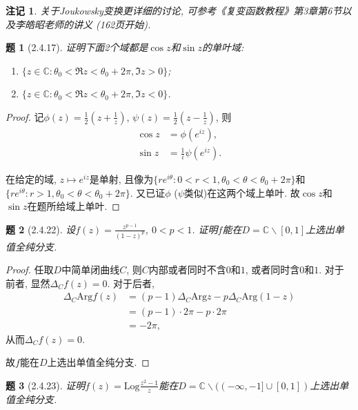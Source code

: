 \documentclass{article}[a4paper, 12pt]
\newtheorem{problem}{题}
\newtheorem*{remark}{注记}
\begin{document}
\begin{remark}
  关于Joukowsky变换更详细的讨论, 可参考《复变函数教程》第3章第6节以及李皓昭老师的讲义 (162页开始).
\end{remark}

\begin{problem}[2.4.17]
  证明下面2个域都是\(\cos z\)和\(\sin z\)的单叶域:
  \begin{enumerate}
    \item \(\{z\in\mathbb C:\theta_0<\Re z<\theta_0+2\pi, \Im z>0\}\);
    \item \(\{z\in\mathbb C:\theta_0<\Re z<\theta_0+2\pi, \Im z<0\}\).
  \end{enumerate}
\end{problem}

\begin{proof}
  记\(\phi(z)=\frac12(z+\frac1z)\), \(\psi(z)=\frac12(z-\frac1z)\), 则\begin{align*}
    \cos z&=\phi(e^{iz}),\\
    \sin z&=\frac1i\psi(e^{iz}).
  \end{align*}

  在给定的域, \(z\mapsto e^{iz}\)是单射, 且像为\(\{re^{i\theta}:0<r<1,\theta_0<\theta<\theta_0+2\pi\}\)和\(\{re^{i\theta}:r>1,\theta_0<\theta<\theta_0+2\pi\}\). 又已证\(\phi\) (\(\psi\)类似)在这两个域上单叶. 故\(\cos z\)和\(\sin z\)在题所给域上单叶.
\end{proof}

\begin{problem}[2.4.22]
  设\(f(z)=\frac{z^{p-1}}{(1-z)^p}\), \(0<p<1\). 证明\(f\)能在\(D=\mathbb{C}\backslash[0,1]\)上选出单值全纯分支.
\end{problem}

\begin{proof}
  任取\(D\)中简单闭曲线\(C\), 则\(C\)内部或者同时不含\(0\)和\(1\), 或者同时含\(0\)和\(1\). 对于前者, 显然\(\Delta_C f(z)=0\). 对于后者, \begin{align*}
    \Delta_C \mathrm{Arg}f(z)
    &=(p-1)\Delta_C\mathrm{Arg}z-p\Delta_C\mathrm{Arg}(1-z)\\
    &=(p-1)\cdot2\pi-p\cdot2\pi\\
    &=-2\pi,
  \end{align*}
  从而\(\Delta_C f(z)=0\).

  故\(f\)能在\(D\)上选出单值全纯分支.
\end{proof}

\begin{problem}[2.4.23]
  证明\(f(z)=\mathrm{Log}\frac{z^2-1}{z}\)能在\(D=\mathbb{C}\backslash((-\infty,-1]\cup[0,1])\)上选出单值全纯分支.
\end{problem}
\end{document}
